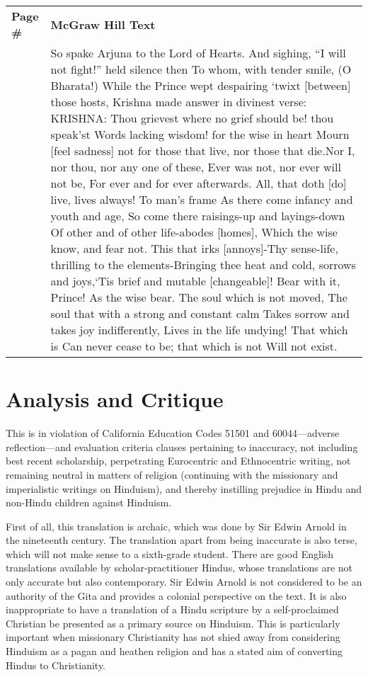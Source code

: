 \begin{longtable}{|>{\raggedleft}p{1.5cm}|p{8.5cm}|}
\multicolumn{2}{c}{\textbf{Table: 4}}\\ 
\hline
\textbf{Page \#} & \textbf{McGraw Hill Text} \tabularnewline
\hline 
280 & So spake Arjuna to the Lord of Hearts. And sighing, “I will not fight!” held silence then To whom, with tender smile, (O Bharata!) While the Prince wept despairing ‘twixt [between] those hosts, Krishna made answer in divinest verse: KRISHNA: Thou grievest where no grief should be! thou speak’st Words lacking wisdom! for the wise in heart Mourn [feel sadness] not for those that live, nor those that die.Nor I, nor thou, nor any one of these, Ever was not, nor ever will not be, For ever and for ever afterwards. All, that doth [do] live, lives always! To man’s frame As there come infancy and youth and age, So come there raisings-up and layings-down Of other and of other life-abodes [homes], Which the wise know, and fear not. This that irks [annoys]-Thy sense-life, thrilling to the elements-Bringing thee heat and cold, sorrows and joys,‘Tis brief and mutable [changeable]! Bear with it, Prince! As the wise bear. The soul which is not moved, The soul that with a strong and constant calm Takes sorrow and takes joy indifferently, Lives in the life undying! That which is Can never cease to be; that which is not Will not exist. \tabularnewline
\hline
\end{longtable}

\section*{Analysis and Critique} 

This is in violation of California Education Codes 51501 and 60044—adverse reflection—and evaluation criteria clauses pertaining to inaccuracy, not including best recent scholarship, perpetrating Eurocentric and Ethnocentric writing, not remaining neutral in matters of religion (continuing with the missionary and imperialistic writings on Hinduism), and thereby instilling prejudice in Hindu and non-Hindu children against Hinduism.\textbf{} 

First of all, this translation is archaic, which was done by Sir Edwin Arnold in the nineteenth century. The translation apart from being inaccurate is also terse, which will not make sense to a sixth-grade student. There are good English translations available by scholar-practitioner Hindus, whose translations are not only accurate but also contemporary. Sir Edwin Arnold is not considered to be an authority of the Gita and provides a colonial perspective on the text. It is also inappropriate to have a translation of a Hindu scripture by a self-proclaimed Christian be presented as a primary source on Hinduism. This is particularly important when missionary Christianity has not shied away from considering Hinduism as a pagan and heathen religion and has a stated aim of converting Hindus to Christianity.

